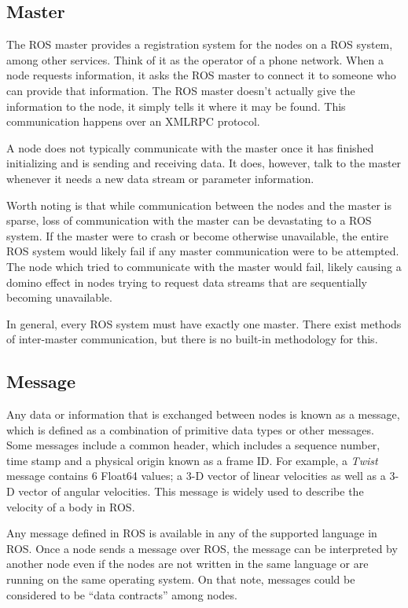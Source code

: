 \hypertarget{master}{%
\subsection{Master}\label{master}}

The ROS master provides a registration system for the nodes on a ROS
system, among other services. Think of it as the operator of a phone
network. When a node requests information, it asks the ROS master to
connect it to someone who can provide that information. The ROS master
doesn't actually give the information to the node, it simply tells it
where it may be found. This communication happens over an XMLRPC
protocol.

A node does not typically communicate with the master once it has
finished initializing and is sending and receiving data. It does,
however, talk to the master whenever it needs a new data stream or
parameter information.

Worth noting is that while communication between the nodes and the
master is sparse, loss of communication with the master can be
devastating to a ROS system. If the master were to crash or become
otherwise unavailable, the entire ROS system would likely fail if any
master communication were to be attempted. The node which tried to
communicate with the master would fail, likely causing a domino effect
in nodes trying to request data streams that are sequentially becoming
unavailable.

In general, every ROS system must have exactly one master. There exist
methods of inter-master communication, but there is no built-in
methodology for this.

\hypertarget{message}{%
\subsection{Message}\label{message}}

Any data or information that is exchanged between nodes is known as a
message, which is defined as a combination of primitive data types or
other messages. Some messages include a common header, which includes a
sequence number, time stamp and a physical origin known as a frame ID.
For example, a \emph{Twist} message contains 6 Float64 values; a 3-D
vector of linear velocities as well as a 3-D vector of angular
velocities. This message is widely used to describe the velocity of a
body in ROS.

Any message defined in ROS is available in any of the supported language
in ROS. Once a node sends a message over ROS, the message can be
interpreted by another node even if the nodes are not written in the
same language or are running on the same operating system. On that note,
messages could be considered to be ``data contracts'' among nodes.

